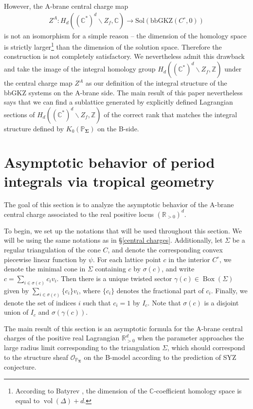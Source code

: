 \documentclass[11pt,reqno]{amsart}
\def\CC {{\mathbb C}}
\def\R {{\mathbb R}}
\def\Z {{\mathbb Z}}
\def\PP {{\mathbb P}}
\theoremstyle{definition}
\numberwithin{equation}{section}
\begin{document}
However, the A-brane central charge map
\begin{align*}
	Z^A: H_d((\CC^*)^d\backslash Z_f, \CC)\rightarrow \mathrm{Sol}(\mathrm{bbGKZ}(C^{\circ},0))
\end{align*}
is not an isomorphism for a simple reason -- the dimension of the homology space is strictly larger\footnote{According to Batyrev \cite{Batyrev}, the dimension of the $\CC$-coefficient homology space is equal to $\operatorname{vol}(\Delta) + d$.} than the dimension of the solution space. Therefore the construction is not completely satisfactory. We nevertheless admit this drawback and take the image of the integral homology group $H_d((\CC^*)^d\backslash Z_f, \Z)$ under the central charge map $Z^A$ as our definition of the integral structure of the bbGKZ systems on the A-brane side. The main result of this paper nevertheless says that we can find a sublattice generated by explicitly defined Lagrangian sections of $H_d((\CC^*)^d\backslash Z_f, \Z)$ of the correct rank that matches the integral structure defined by $K_0(\PP_{\mathbf{\Sigma}})$ on the B-side.


\section{Asymptotic behavior of period integrals via tropical geometry}\label{asymptotic}

The goal of this section is to analyze the asymptotic behavior of the A-brane central charge associated to the real positive locus $(\R_{> 0})^d$.

\smallskip

 To begin, we set up the notations that will be used throughout this section. We will be using the same notations as in \S\ref{central charges}. Additionally, let $\Sigma$ be a regular triangulation of the cone $C$, and denote the corresponding convex piecewise linear function by $\psi$. For each lattice point $c$ in the interior $C^{\circ}$, we denote the minimal cone in $\Sigma$ containing $c$ by $\sigma(c)$, and write $c=\sum_{i\in\sigma(c)}c_iv_i$. Then there is a unique twisted sector $\gamma(c)\in\operatorname{Box}(\Sigma)$ given by $\sum_{i\in\sigma(c)}\{c_i\}v_i$, where $\{c_i\}$ denotes the fractional part of $c_i$. Finally, we denote the set of indices $i$ such that $c_i=1$ by $I_c$. Note that $\sigma(c)$ is a disjoint union of $I_c$ and $\sigma(\gamma(c))$.
 
 \smallskip



The main result of this section is an asymptotic formula for the A-brane central charges of the positive real Lagrangian $\R_{>0}^d$ when the parameter approaches the large radius limit corresponding to the triangulation $\Sigma$, which should correspond to the structure sheaf $\mathcal{O}_{\PP_{\mathbf{\Sigma}}}$ on the B-model according to the prediction of SYZ conjecture. 
\end{document}
